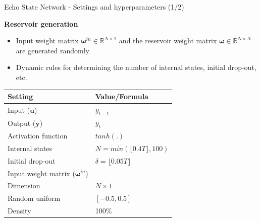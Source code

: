 \documentclass[aspectratio=169]{beamer}
\begin{document}
\begin{frame}[t]{Echo State Network  - Settings and hyperparameters (1/2)}
    \begin{minipage}[t]{0.3\textwidth}
        \vspace{0pt}
        \textbf{Reservoir generation}
        \begin{itemize}
        	\item Input weight matrix $\boldsymbol{\omega}^{in} \in \mathbb{R}^{N \times 1}$ and the reservoir weight matrix $\boldsymbol{\omega} \in \mathbb{R}^{N \times N}$ are generated randomly
        	\item Dynamic rules for determining the number of internal states, initial drop-out, etc.
        \end{itemize}
    \end{minipage}%
    \hfill
    \begin{minipage}[t]{0.7\textwidth}
        \vspace{0pt}
        	\begin{table}[ht]
        	\scriptsize
			\centering
				\begin{tabular}{ll}
				\toprule
				\textbf{Setting}                                    & \textbf{Value/Formula}               \\
				\midrule
				Input ($\mathbf{u}$)                                & $y_{t-1}$                            \\
				Output ($\mathbf{y}$)                               & $y_{t}$                              \\
				Activation function                                 & $tanh(.)$                            \\
				Internal states                                     & $N = min(\lfloor 0.4T \rfloor, 100)$ \\
				Initial drop-out                                    & $\delta = \lfloor 0.05T \rfloor$     \\
				\midrule
				Input weight matrix ($\boldsymbol{\omega}^{in}$)    &                                      \\
				\hspace{2.5mm} Dimension                            & $N \times 1$                         \\
				\hspace{2.5mm} Random uniform                       & $[-0.5, 0.5]$                        \\
				\hspace{2.5mm} Density                              & 100\%                                \\

\end{tabular}
\end{table}
\end{minipage}
\end{frame}
\end{document}
